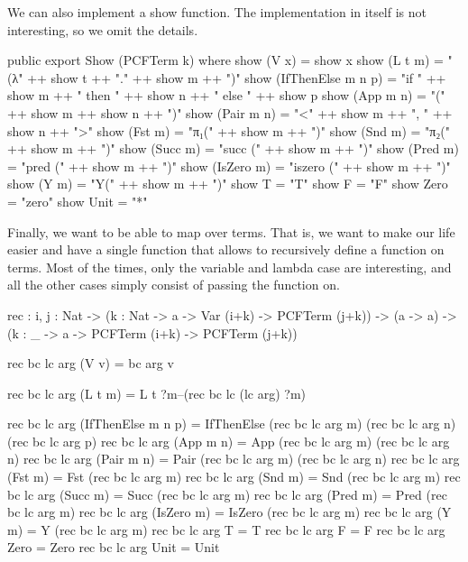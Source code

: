 We can also implement a show function. The implementation in itself is not
interesting, so we omit the details.

\begin{hidden}
public export
Show (PCFTerm k) where
  show (V x)              = show x
  show (L t m)            = "(λ" ++ show t ++ "." ++ show m ++ ")"
  show (IfThenElse m n p) = "if " ++ show m ++ " then " ++ show n ++ " else " ++ show p
  show (App m n)          = "(" ++ show m ++ show n ++ ")"
  show (Pair m n)         = "<" ++ show m ++ ", " ++ show n ++ ">"
  show (Fst m)            = "π₁(" ++ show m ++ ")"
  show (Snd m)            = "π₂(" ++ show m ++ ")"
  show (Succ m)           = "succ (" ++ show m ++ ")"
  show (Pred m)           = "pred (" ++ show m ++ ")"
  show (IsZero m)         = "iszero (" ++ show m ++ ")"
  show (Y m)              = "Y(" ++ show m ++ ")"
  show T                  = "T"
  show F                  = "F"
  show Zero               = "zero"
  show Unit               = "*"
\end{hidden}

Finally, we want to be able to map over terms. That is, we want to make our life
easier and have a single function that allows to recursively define a function
on terms. Most of the times, only the variable and lambda case are interesting,
and all the other cases simply consist of passing the function on.

\begin{code}
rec : {i, j : Nat} -> ({k : Nat} -> a -> Var (i+k) -> PCFTerm (j+k)) -> (a -> a) -> ({k : _} -> a -> PCFTerm (i+k) -> PCFTerm (j+k))


rec bc lc arg (V v)              = bc arg v


rec bc lc arg (L t m)            = L t ?m--(rec bc lc (lc arg) ?m)


rec bc lc arg (IfThenElse m n p) =
    IfThenElse (rec bc lc arg m) (rec bc lc arg n) (rec bc lc arg p)
rec bc lc arg (App m n)          = App (rec bc lc arg m) (rec bc lc arg n)
rec bc lc arg (Pair m n)         = Pair (rec bc lc arg m) (rec bc lc arg n)
rec bc lc arg (Fst m)            = Fst (rec bc lc arg m)
rec bc lc arg (Snd m)            = Snd (rec bc lc arg m)
rec bc lc arg (Succ m)           = Succ (rec bc lc arg m)
rec bc lc arg (Pred m)           = Pred (rec bc lc arg m)
rec bc lc arg (IsZero m)         = IsZero (rec bc lc arg m)
rec bc lc arg (Y m)              = Y (rec bc lc arg m)
rec bc lc arg T                  = T
rec bc lc arg F                  = F
rec bc lc arg Zero               = Zero
rec bc lc arg Unit               = Unit
\end{code}
